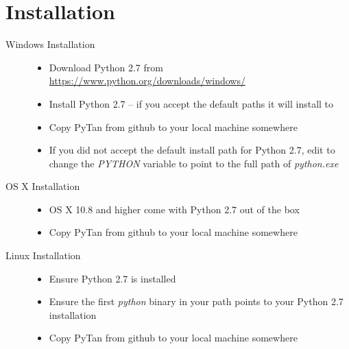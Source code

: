 \documentclass[letterpaper,10pt,english]{sphinxmanual}
\begin{document}
\section{Installation}
\label{description:installation}\begin{description}
\item[{Windows Installation}] \leavevmode\begin{itemize}
\item {} 
Download Python 2.7 from \href{https://www.python.org/downloads/windows/}{https://www.python.org/downloads/windows/}

\item {} 
Install Python 2.7 -- if you accept the default paths it will install to 

\item {} 
Copy PyTan from github to your local machine somewhere

\item {} 
If you did not accept the default install path for Python 2.7, edit  to change the \emph{PYTHON} variable to point to the full path of \emph{python.exe}

\end{itemize}

\item[{OS X Installation}] \leavevmode\begin{itemize}
\item {} 
OS X 10.8 and higher come with Python 2.7 out of the box

\item {} 
Copy PyTan from github to your local machine somewhere

\end{itemize}

\item[{Linux Installation}] \leavevmode\begin{itemize}
\item {} 
Ensure Python 2.7 is installed

\item {} 
Ensure the first \emph{python} binary in your path points to your Python 2.7 installation

\item {} 
Copy PyTan from github to your local machine somewhere

\end{itemize}

\end{description}
\end{document}
